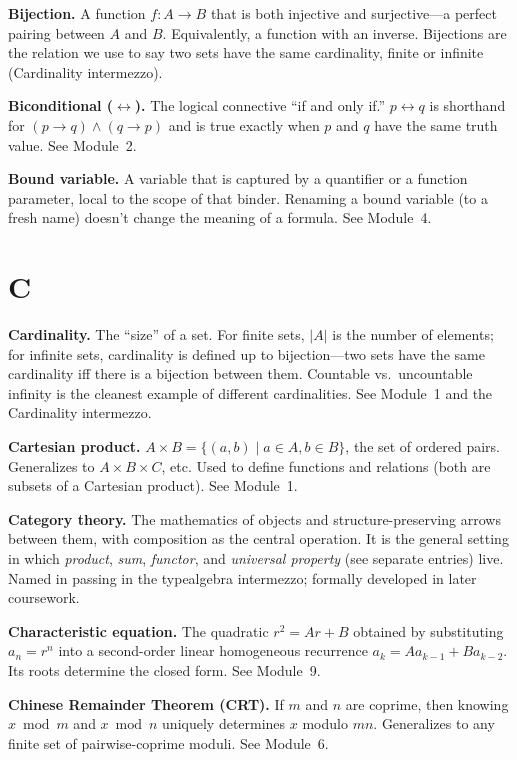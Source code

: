 \documentclass[11pt]{article}
\begin{document}
\textbf{Bijection.} A function $f : A \to B$ that is both injective and surjective---a perfect pairing between $A$ and $B$. Equivalently, a function with an inverse. Bijections are the relation we use to say two sets have the same cardinality, finite or infinite (Cardinality intermezzo).

\textbf{Biconditional ($\leftrightarrow$).} The logical connective ``if and only if.'' $p \leftrightarrow q$ is shorthand for $(p \to q) \wedge (q \to p)$ and is true exactly when $p$ and $q$ have the same truth value. See Module~2.

\textbf{Bound variable.} A variable that is captured by a quantifier or a function parameter, local to the scope of that binder. Renaming a bound variable (to a fresh name) doesn't change the meaning of a formula. See Module~4.

\section*{C}

\textbf{Cardinality.} The ``size'' of a set. For finite sets, $|A|$ is the number of elements; for infinite sets, cardinality is defined up to bijection---two sets have the same cardinality iff there is a bijection between them. Countable vs.\ uncountable infinity is the cleanest example of different cardinalities. See Module~1 and the Cardinality intermezzo.

\textbf{Cartesian product.} $A \times B = \{(a, b) \mid a \in A, b \in B\}$, the set of ordered pairs. Generalizes to $A \times B \times C$, etc. Used to define functions and relations (both are subsets of a Cartesian product). See Module~1.

\textbf{Category theory.} The mathematics of objects and structure-preserving arrows between them, with composition as the central operation. It is the general setting in which \emph{product}, \emph{sum}, \emph{functor}, and \emph{universal property} (see separate entries) live. Named in passing in the typealgebra intermezzo; formally developed in later coursework.

\textbf{Characteristic equation.} The quadratic $r^2 = Ar + B$ obtained by substituting $a_n = r^n$ into a second-order linear homogeneous recurrence $a_k = A a_{k-1} + B a_{k-2}$. Its roots determine the closed form. See Module~9.

\textbf{Chinese Remainder Theorem (CRT).} If $m$ and $n$ are coprime, then knowing $x \bmod m$ and $x \bmod n$ uniquely determines $x$ modulo $mn$. Generalizes to any finite set of pairwise-coprime moduli. See Module~6.
\end{document}
